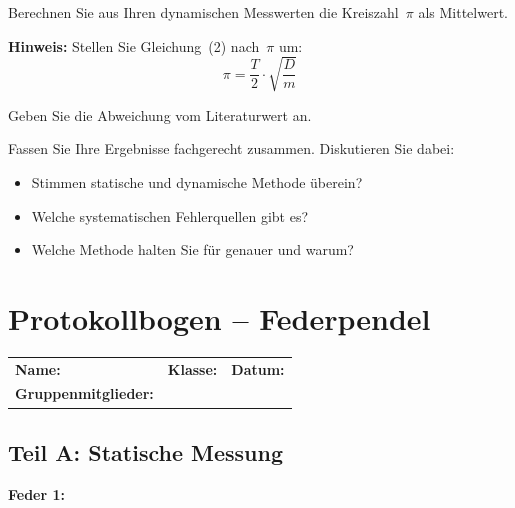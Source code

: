 \documentclass[11pt,a4paper]{scrartcl}
\begin{document}
\begin{sternaufgabe}[title={\faIcon{star} Aufgabe 6: Bestimmung von $\pi$}]
	Berechnen Sie aus Ihren dynamischen Messwerten die Kreiszahl~$\pi$ als Mittelwert.

	\textbf{Hinweis:} Stellen Sie Gleichung~(2) nach~$\pi$ um:
	\[ \pi = \frac{T}{2} \cdot \sqrt{\frac{D}{m}} \]

	Geben Sie die Abweichung vom Literaturwert an.
\end{sternaufgabe}

\begin{sternaufgabe}[title={\faIcon{star} Aufgabe 7: Zusammenfassung}]
	Fassen Sie Ihre Ergebnisse fachgerecht zusammen. Diskutieren Sie dabei:
	\begin{itemize}
		\item Stimmen statische und dynamische Methode überein?
		\item Welche systematischen Fehlerquellen gibt es?
		\item Welche Methode halten Sie für genauer und warum?
	\end{itemize}
\end{sternaufgabe}

\newpage
\section*{Protokollbogen -- Federpendel}

\begin{center}
	\begin{tcolorbox}[colback=white, colframe=black, width=\textwidth, boxrule=0.5pt]
		\begin{tabular}{@{}p{}p{}p{}@{}}
			\textbf{Name:} \hrulefill & \textbf{Klasse:} \hrulefill & \textbf{Datum:} \hrulefill \\[0.4cm]
			\textbf{Gruppenmitglieder:} & \multicolumn{2}{l}{\hrulefill} \\
		\end{tabular}
	\end{tcolorbox}
\end{center}

\subsection*{Teil A: Statische Messung}

\textbf{Feder 1:}
\end{document}
